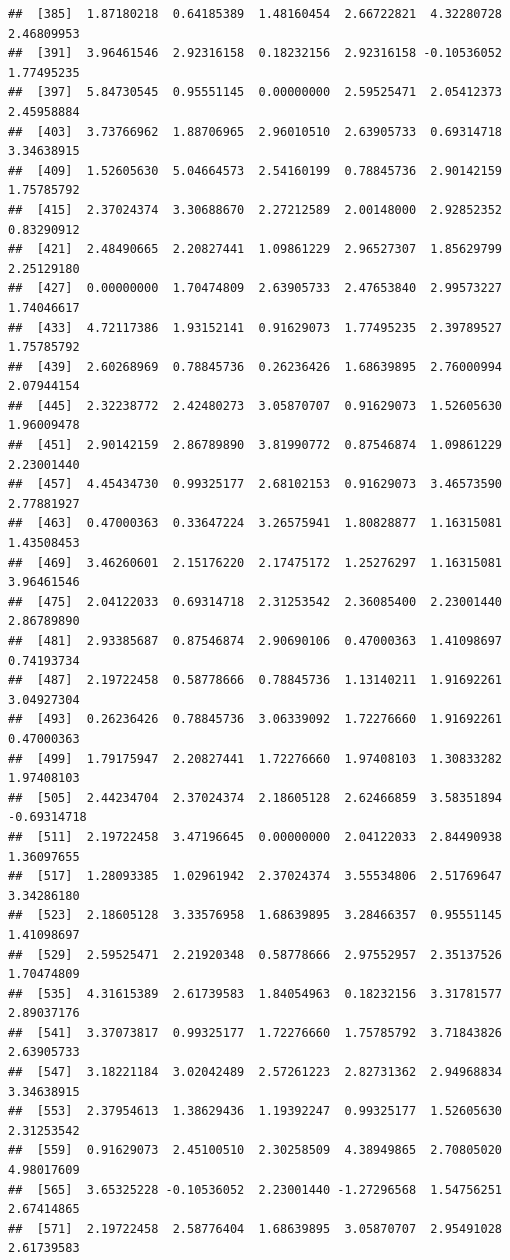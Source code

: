 \documentclass[
]{article}
\begin{document}
\begin{verbatim}
##  [385]  1.87180218  0.64185389  1.48160454  2.66722821  4.32280728  2.46809953
##  [391]  3.96461546  2.92316158  0.18232156  2.92316158 -0.10536052  1.77495235
##  [397]  5.84730545  0.95551145  0.00000000  2.59525471  2.05412373  2.45958884
##  [403]  3.73766962  1.88706965  2.96010510  2.63905733  0.69314718  3.34638915
##  [409]  1.52605630  5.04664573  2.54160199  0.78845736  2.90142159  1.75785792
##  [415]  2.37024374  3.30688670  2.27212589  2.00148000  2.92852352  0.83290912
##  [421]  2.48490665  2.20827441  1.09861229  2.96527307  1.85629799  2.25129180
##  [427]  0.00000000  1.70474809  2.63905733  2.47653840  2.99573227  1.74046617
##  [433]  4.72117386  1.93152141  0.91629073  1.77495235  2.39789527  1.75785792
##  [439]  2.60268969  0.78845736  0.26236426  1.68639895  2.76000994  2.07944154
##  [445]  2.32238772  2.42480273  3.05870707  0.91629073  1.52605630  1.96009478
##  [451]  2.90142159  2.86789890  3.81990772  0.87546874  1.09861229  2.23001440
##  [457]  4.45434730  0.99325177  2.68102153  0.91629073  3.46573590  2.77881927
##  [463]  0.47000363  0.33647224  3.26575941  1.80828877  1.16315081  1.43508453
##  [469]  3.46260601  2.15176220  2.17475172  1.25276297  1.16315081  3.96461546
##  [475]  2.04122033  0.69314718  2.31253542  2.36085400  2.23001440  2.86789890
##  [481]  2.93385687  0.87546874  2.90690106  0.47000363  1.41098697  0.74193734
##  [487]  2.19722458  0.58778666  0.78845736  1.13140211  1.91692261  3.04927304
##  [493]  0.26236426  0.78845736  3.06339092  1.72276660  1.91692261  0.47000363
##  [499]  1.79175947  2.20827441  1.72276660  1.97408103  1.30833282  1.97408103
##  [505]  2.44234704  2.37024374  2.18605128  2.62466859  3.58351894 -0.69314718
##  [511]  2.19722458  3.47196645  0.00000000  2.04122033  2.84490938  1.36097655
##  [517]  1.28093385  1.02961942  2.37024374  3.55534806  2.51769647  3.34286180
##  [523]  2.18605128  3.33576958  1.68639895  3.28466357  0.95551145  1.41098697
##  [529]  2.59525471  2.21920348  0.58778666  2.97552957  2.35137526  1.70474809
##  [535]  4.31615389  2.61739583  1.84054963  0.18232156  3.31781577  2.89037176
##  [541]  3.37073817  0.99325177  1.72276660  1.75785792  3.71843826  2.63905733
##  [547]  3.18221184  3.02042489  2.57261223  2.82731362  2.94968834  3.34638915
##  [553]  2.37954613  1.38629436  1.19392247  0.99325177  1.52605630  2.31253542
##  [559]  0.91629073  2.45100510  2.30258509  4.38949865  2.70805020  4.98017609
##  [565]  3.65325228 -0.10536052  2.23001440 -1.27296568  1.54756251  2.67414865
##  [571]  2.19722458  2.58776404  1.68639895  3.05870707  2.95491028  2.61739583

\end{verbatim}
\end{document}
